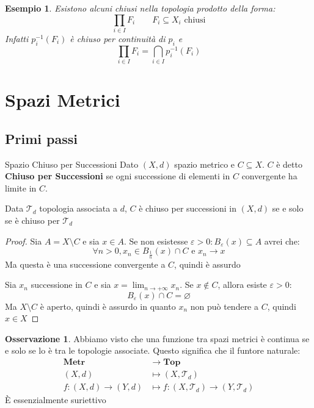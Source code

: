 \documentclass[11pt,a4paper,twoside]{article}
\newcommand{\vareps}{\varepsilon}
\newtheorem{es}{Esempio}
\theoremstyle{definition}
\newtheorem*{oss}{Osservazione}
\begin{document}
\begin{es}
	Esistono alcuni chiusi nella topologia prodotto della forma:
	\[ \prod_{i \in I}F_i \qquad F_i \subseteq X_i \text{ chiusi} \]
	Infatti $p_i^{-1}(F_i)$ è chiuso per continuità di $p_i$ e
	\[ \prod_{i \in I}F_i = \bigcap_{i \in I} p^{-1}_i (F_i) \]
\end{es}

\newpage

\section{Spazi Metrici}

\subsection{Primi passi}

\begin{defn}{Spazio Chiuso per Successioni}{}
	Dato $(X, d)$ spazio metrico e $C \subseteq X$. $C$ è detto \textbf{Chiuso per Successioni} se ogni successione di elementi in $C$ convergente ha limite in $C$.
\end{defn}

\begin{prop}{}{}
	Data $\mathcal T_d$ topologia associata a $d$, $C$ è chiuso per successioni in $(X,d)$ se e solo se è chiuso per $\mathcal T_d$
\end{prop}

\begin{proof}
	\fbox{$\Rightarrow$} Sia $A = X \setminus C$ e sia $x \in A$. Se non esistesse $\vareps >0:B_\vareps(x)\subseteq A$ avrei che:
	\[ \forall n >0, x_n \in B_{\frac 1n}(x) \cap C \text{ e }x_n \to x \]
	Ma questa è una successione convergente a $C$, quindi è assurdo

	\fbox{$\Leftarrow$} Sia $x_n$ successione in $C$ e sia $\displaystyle{x = \lim_{n \to +\infty}x_n}$. Se $x \not \in C$, allora esiste $\vareps>0$:
	\[ B_\vareps(x)\cap C = \varnothing \]
	Ma $X \setminus C$ è aperto, quindi è assurdo in quanto $x_n$ non può tendere a $C$, quindi $x \in X$
\end{proof}

\begin{oss}
	Abbiamo visto che una funzione tra spazi metrici è continua se e solo se lo è tra le topologie associate. Questo significa che il funtore naturale:
	\begin{align*}
		\bm{Metr} & \to \bm{Top}\\
		(X,d) & \mapsto (X,\mathcal T_d)\\
		f:(X,d)\to(Y,d) & \mapsto f:(X,\mathcal T_d) \to (Y,\mathcal T_d)
	\end{align*}
	È essenzialmente suriettivo
\end{oss}
\end{document}
